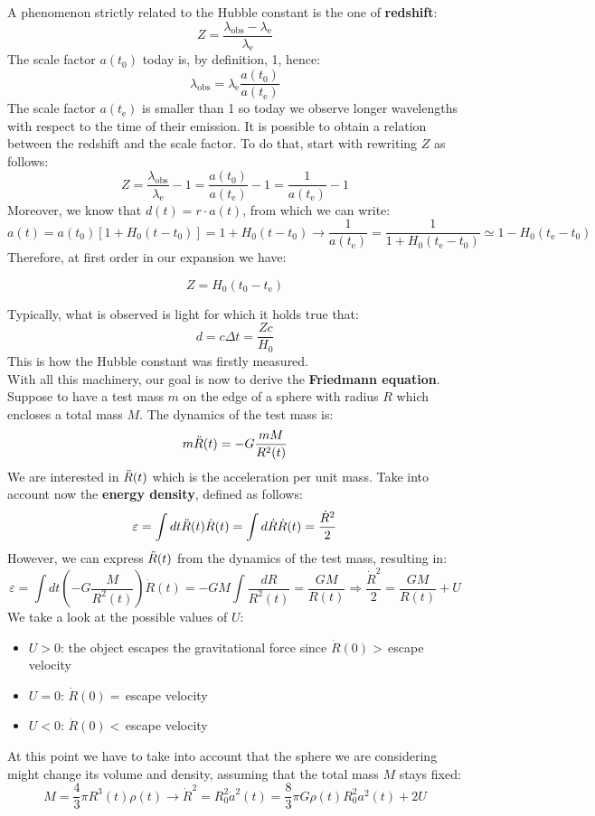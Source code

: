 \documentclass[10.75pt,a4paper,openright,bottom=2cm]{article}
\newcommand{\beginbox}[1]{\begin{tcolorbox}[width=\textwidth,colback={black!40},title={#1},colbacktitle={purple!55},coltitle=black]}
\renewcommand{\endbox}{\end{tcolorbox}\noindent}
\begin{document}
A phenomenon strictly related to the Hubble constant is the one of \textbf{redshift}:
\[
Z=\frac{\lambda_{\text{obs}}-\lambda_{\text{e}}}{\lambda_{\text{e}}}
\]
The scale factor $a(t_0)$ today is, by definition, 1, hence:
\[
\lambda_{\text{obs}}=\lambda_{\text{e}}\frac{a(t_0)}{a(t_{\text{e}})}
\]
The scale factor $a(t_{\text{e}})$ is smaller than 1 so today we observe longer wavelengths with respect to the time of their emission. It is possible to obtain a relation between the redshift and the scale factor. To do that, start with rewriting $Z$ as follows:
\[
Z=\frac{\lambda_{\text{obs}}}{\lambda_{\text{e}}}-1=\frac{a(t_0)}{a(t_{\text{e}})}-1=\frac{1}{a(t_{\text{e}})}-1
\]
Moreover, we know that $d(t)=r\cdot a(t)$, from which we can write:
\[
a(t)=a(t_0)[1+H_0(t-t_0)]=1+H_0(t-t_0)\to\frac{1}{a(t_{\text{e}})}=\frac{1}{1+H_0(t_{\text{e}}-t_0)}\simeq1-H_0(t_{\text{e}}-t_0)
\]
Therefore, at first order in our expansion we have:
\beginbox{Redshift}
\[
Z=H_0(t_0-t_{\text{e}})
\]
\endbox
Typically, what is observed is light for which it holds true that:
\[
d=c\Delta t=\frac{Zc}{H_0}
\]
This is how the Hubble constant was firstly measured.\\
With all this machinery, our goal is now to derive the \textbf{Friedmann equation}. Suppose to have a test mass $m$ on the edge of a sphere with radius $R$ which encloses a total mass $M$. The dynamics of the test mass is:
\[
m\Ddot{R}(t)=-G\frac{mM}{R^2(t)}
\]
We are interested in $\Ddot{R}(t)$ which is the acceleration per unit mass. Take into account now the \textbf{energy density}, defined as follows:
\[
\varepsilon=\int dt\Ddot{R}(t)\Dot{R}(t)=\int d\Dot{R}\Dot{R}(t)=\frac{\Dot{R}^2}{2}
\]
However, we can express $\Ddot{R}(t)$ from the dynamics of the test mass, resulting in:
\[
\varepsilon=\int dt\left(-G\frac{M}{R^2(t)}\right)\Dot{R}(t)=-GM\int \frac{dR}{R^2(t)}=\frac{GM}{R(t)}\Rightarrow\frac{\Dot{R}^2}{2}=\frac{GM}{R(t)}+U
\]
We take a look at the possible values of $U$:
\begin{itemize}
    \item $U>0$: the object escapes the gravitational force since $\Dot{R}(0)>$\,escape velocity
    \item $U=0$: $\Dot{R}(0)=$\,escape velocity
    \item $U<0$: $\Dot{R}(0)<$\,escape velocity
\end{itemize}
At this point we have to take into account that the sphere we are considering might change its volume and density, assuming that the total mass $M$ stays fixed:
\[
M=\frac{4}{3}\pi R^3(t)\rho(t)\to\Dot{R}^2=R_0^2\Dot{a}^2(t)=\frac{8}{3}\pi G\rho(t)R_0^2a^2(t)+2U
\]
\end{document}
